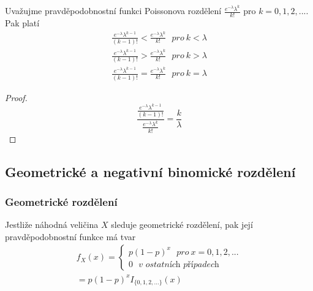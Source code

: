 \begin{theorem}
Uvažujme pravděpodobnostní funkci Poissonova rozdělení $\frac{e^{-\lambda}\lambda^k}{k!}$ pro $k = 0, 1, 2, ...$. Pak platí
\begin{gather*}
\frac{e^{-\lambda}\lambda^{k-1}}{(k-1)!} < \frac{e^{-\lambda}\lambda^k}{k!}~~~\textit{pro}~k < \lambda\\
\frac{e^{-\lambda}\lambda^{k-1}}{(k-1)!} > \frac{e^{-\lambda}\lambda^k}{k!}~~~\textit{pro}~k > \lambda\\
\frac{e^{-\lambda}\lambda^{k-1}}{(k-1)!} = \frac{e^{-\lambda}\lambda^k}{k!}~~~\textit{pro}~k = \lambda
\end{gather*}
\end{theorem}

\begin{proof}
\begin{equation*}
\frac{\frac{e^{-\lambda} \lambda^{k-1}}{(k-1)!}}{\frac{e^{-\lambda} \lambda^k}{k!}} = \frac{k}{\lambda}
\end{equation*}
\end{proof}

\subsection{Geometrické a negativní binomické rozdělení}

\subsubsection{Geometrické rozdělení}

\begin{definition}
Jestliže náhodná veličina $X$ sleduje geometrické rozdělení, pak její pravděpodobnostní funkce má tvar
\begin{gather*}
f_X(x) =
\begin{cases}
p(1-p)^x~~~\textit{pro}~x = 0, 1, 2, ...\\
0~~~\textit{v ostatních případech}
\end{cases}\\
= p(1 - p)^x I_{\{0,1,2,...\}}(x)
\end{gather*}
\end{definition}

